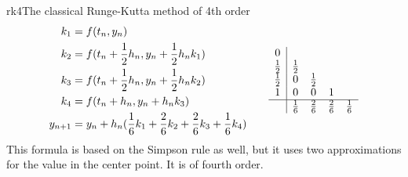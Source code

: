 \begin{Example*}{rk4}{The classical Runge-Kutta method of 4th order}
  \begin{gather*}
    \begin{aligned}
      k_1 & = f(t_n, y_n) \\
      k_2 & = f(t_n + \frac12 h_n, y_n + \frac12 h_n k_1) \\
      k_3 & = f(t_n + \frac12 h_n, y_n + \frac12 h_n k_2) \\
      k_4 & = f(t_n + h_n, y_n + h_n k_3) \\
      y_{n+1} & = y_n + h_n ( \frac16 k_1 + \frac26 k_2 + \frac26 k_3 + \frac16 k_4 ) \\
    \end{aligned}
    \qquad
    \begin{array}{c|cccc}
      0 & \\
      \frac12 & \frac12 \\
      \frac12 & 0 & \frac12 \\
      1 & 0 & 0 & 1 \\
      \hline
        & \frac16 & \frac26 & \frac26 & \frac16 \\
    \end{array}
  \end{gather*}
  This formula is based on the Simpson rule as well, but it uses two
  approximations for the value in the center point. It is of fourth
  order.
\end{Example*}

